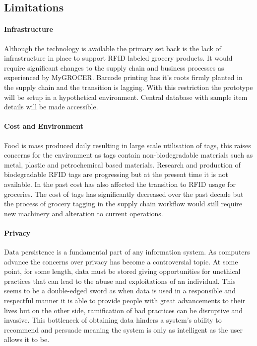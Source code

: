 \documentclass[a4paper, 11pt]{article}
\begin{document}
\vspace{\baselineskip}
\vspace{\baselineskip}
\vspace{\baselineskip}

\subsection{Limitations}

\paragraph{Infrastructure}Although the technology is available the primary set back is the lack of infrastructure in place to support RFID labeled grocery products. It would require significant changes to the supply chain and business processes \cite{pervasiveComp} as experienced by MyGROCER. Barcode printing has it's roots firmly planted in the supply chain and the transition is lagging. With this restriction the prototype will be setup in a hypothetical environment. Central database with sample item details will be made accessible. 

\paragraph{Cost and Environment}Food is mass produced daily resulting in large scale utilisation of tags, this raises concerns for the environment as tags contain non-biodegradable materials such as metal, plastic and petrochemical based materials.\cite{bioTags} Research and production of biodegradable RFID tags are progressing but at the present time it is not available. In the past cost has also affected the transition to RFID usage for groceries. The cost of tags has significantly decreased over the past decade but the process of grocery tagging in the supply chain workflow would still require new machinery and alteration to current operations. 

\paragraph{Privacy}Data persistence is a fundamental part of any information system. As computers advance the concerns over privacy has become a controversial topic. At some point, for some length, data must be stored giving opportunities for unethical practices that can lead to the abuse and exploitations of an individual. This seems to be a double-edged sword as when data is used in a responsible and respectful manner it is able to provide people with great advancements to their lives but on the other side, ramification of bad practices can be disruptive and invasive. This bottleneck of obtaining data hinders a system's ability to recommend and persuade meaning the system is only as intelligent as the user allows it to be.
\clearpage
\end{document}
